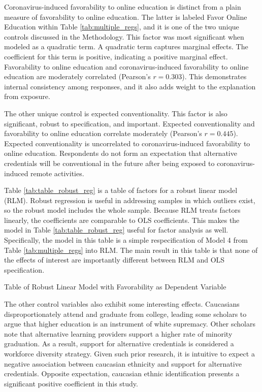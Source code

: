 \documentclass[review]{elsarticle}
\begin{document}
Coronavirus-induced favorability to online education is distinct from a plain measure of favorability to online education.
The latter is labeled Favor Online Education within Table \ref{tab:multiple_regs},
and it is one of the two unique controls discussed in the Methodology.
This factor was most significant when modeled as a quadratic term.
A quadratic term captures marginal effects.
The coefficient for this term is positive, indicating a positive marginal effect.
Favorability to online education
and coronavirus-induced favorability to online education are moderately correlated (Pearson's $r=0.303$).
This demonstrates internal consistency among responses,
and it also adds weight to the explanation from exposure.

The other unique control is expected conventionality.
This factor is also significant, robust to specification, and important.
Expected conventionality and favorability to online education correlate moderately (Pearson's $r=0.445$).
Expected conventionality is uncorrelated to coronavirus-induced favorability to online education.
Respondents do not form an expectation that alternative credentials will be conventional in the future
after being exposed to coronavirus-induced remote activities.

Table \ref{tab:table_robust_reg} is a table of factors for a robust linear model (RLM).
Robust regression is useful in addressing samples in which outliers exist, so the robust model includes the whole sample.
Because RLM treats factors linearly, the coefficients are comparable to OLS coefficients.
This makes the model in Table \ref{tab:table_robust_reg} useful for factor analysis as well.
Specifically, the model in this table is a simple respecification of Model 4 from Table \ref{tab:multiple_regs} into RLM.
The main result in this table is that none of the effects of interest are importantly different between RLM and OLS specification.

\begin{table}
    \caption{Table of Robust Linear Model with Favorability as Dependent Variable}
    \resizebox{\columnwidth}{!}{
        
    }
    \label{tab:table_robust_reg}
\end{table}

The other control variables also exhibit some interesting effects.
Caucasians disproportionately attend and graduate from college,
leading some scholars to argue that higher education is an instrument of white supremacy\cite{hikido2016whitened, dennis2001skillful}.
Other scholars note that alternative learning providers support a higher rate of minority graduation.
As a result, support for alternative credentials is considered a workforce diversity strategy\cite{brown2017complex, jones2018alternative, rossiter2019designing}.
Given such prior research,
it is intuitive to expect a negative association between caucasian ethnicity and support for alternative credentials.
Opposite expectation, caucasian ethnic identification presents a significant positive coefficient in this study.
\end{document}
